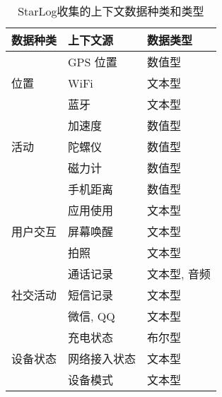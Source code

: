 \begin{center}
\begin{table}[H]
	\renewcommand{\arraystretch}{1.3}
	\caption{StarLog收集的上下文数据种类和类型}
	\vspace{0.01cm}
	\label{tablesource}
	\centering
	\begin{tabular}{p{4cm} p{4cm} p{4cm}}
		\toprule[1.5pt]
		\textbf{数据种类} & \textbf{上下文源} & \textbf{数据类型} \\
		\hline
		& GPS 位置 & 数值型\\
		\cline{2-3}
		位置 & WiFi & 文本型\\
		\cline{2-3}
		& 蓝牙 & 文本型 \\
		\hline
		& 加速度 & 数值型\\
		\cline{2-3}
		活动 & 陀螺仪 & 数值型\\
		\cline{2-3}
		& 磁力计 & 数值型 \\
		\cline{2-3}
		& 手机距离 & 数值型 \\
		\hline
		& 应用使用 & 文本型\\
		\cline{2-3}
		用户交互 & 屏幕唤醒 & 文本型\\
		\cline{2-3}
		& 拍照 & 文本型 \\
		\hline
		& 通话记录 & 文本型, 音频\\
		\cline{2-3}
		社交活动 & 短信记录 & 文本型\\
		\cline{2-3}
		& 微信, QQ & 文本型 \\
		\hline
		& 充电状态 & 布尔型\\
		\cline{2-3}
		设备状态 & 网络接入状态 & 文本型\\
		\cline{2-3}
		& 设备模式 & 文本型 \\
		\bottomrule[1.5pt]
	\end{tabular}
\end{table}
\end{center}

